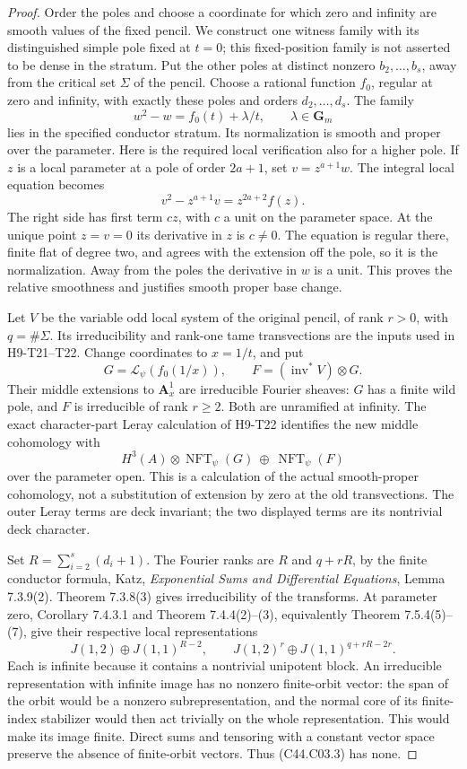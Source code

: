 \documentclass[11pt]{article}
\theoremstyle{remark}\newtheorem{remark}[theorem]{Remark}
\begin{document}
\begin{proof}
Order the poles and choose a coordinate for which zero and infinity
are smooth values of the fixed pencil. We construct one witness
family with its distinguished simple pole fixed at $t=0$; this
fixed-position family is not asserted to be dense in the stratum.
Put the other
poles at distinct nonzero $b_2,\ldots,b_s$, away from the critical set
$\Sigma$ of the pencil. Choose a rational function $f_0$, regular at zero
and infinity, with exactly these poles and orders $d_2,\ldots,d_s$.
The family
\[
                  w^2-w=f_0(t)+\lambda/t,
                  \qquad \lambda\in\mathbf G_m
 \tag{C44.C03.2}
\]
lies in the specified conductor stratum. Its normalization is smooth
and proper over the parameter. Here is the required local verification
also for a higher pole. If $z$ is a local parameter at a pole of order
$2a+1$, set $v=z^{a+1}w$. The integral local equation becomes
\[
 v^2-z^{a+1}v=z^{2a+2}f(z).
\]
The right side has first term $c z$, with $c$ a unit on the parameter
space. At the unique point $z=v=0$ its derivative in $z$ is $c\ne0$.
The equation is regular there, finite flat of degree two, and agrees
with the extension off the pole, so it is the normalization. Away from
the poles the derivative in $w$ is a unit. This proves the relative
smoothness and justifies smooth proper base change.

Let $V$ be the variable odd local system of the original pencil,
of rank $r>0$, with $q=\#\Sigma$. Its irreducibility and rank-one tame
transvections are the inputs used in H9-T21--T22. Change coordinates
to $x=1/t$, and put
\[
 G=\mathcal L_\psi(f_0(1/x)),\qquad
 F=(\operatorname{inv}^*V)\otimes G.
\]
Their middle extensions to $\mathbf A^1_x$ are irreducible Fourier
sheaves: $G$ has a finite wild pole, and $F$ is irreducible of rank
$r\ge2$. Both are unramified at infinity. The exact character-part
Leray calculation of H9-T22 identifies the new middle cohomology
with
\[
 H^3(A)\otimes\operatorname{NFT}_\psi(G)
       \ \oplus\ \operatorname{NFT}_\psi(F)
 \tag{C44.C03.3}
\]
over the parameter open. This is a calculation of the actual
smooth-proper cohomology, not a substitution of extension by zero at
the old transvections. The outer Leray terms are deck invariant; the
two displayed terms are its nontrivial deck character.

Set $R=\sum_{i=2}^s(d_i+1)$. The Fourier ranks are $R$ and $q+rR$,
by the finite conductor formula, Katz, \emph{Exponential Sums and
Differential Equations}, Lemma 7.3.9(2). Theorem 7.3.8(3) gives
irreducibility of the transforms. At parameter zero, Corollary
7.4.3.1 and Theorem 7.4.4(2)--(3), equivalently Theorem 7.5.4(5)--(7),
give their respective local representations
\[
 J(1,2)\oplus J(1,1)^{R-2},\qquad
 J(1,2)^{r}\oplus J(1,1)^{q+rR-2r}.
 \tag{C44.C03.4}
\]
Each is infinite because it contains a nontrivial unipotent block.
An irreducible representation with infinite image has no nonzero
finite-orbit vector: the span of the orbit would be a nonzero
subrepresentation, and the normal core of its finite-index stabilizer
would then act trivially on the whole representation. This would make
its image finite. Direct sums and tensoring with a constant vector
space preserve the absence of finite-orbit vectors. Thus (C44.C03.3)
has none.


\end{proof}
\end{document}
